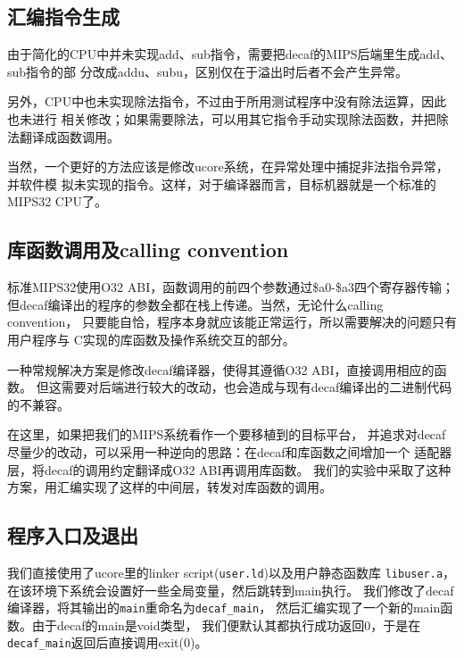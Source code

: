 
\subsection{汇编指令生成}
由于简化的CPU中并未实现add、sub指令，需要把decaf的MIPS后端里生成add、sub指令的部
分改成addu、subu，区别仅在于溢出时后者不会产生异常。

另外，CPU中也未实现除法指令，不过由于所用测试程序中没有除法运算，因此也未进行
相关修改；如果需要除法，可以用其它指令手动实现除法函数，并把除法翻译成函数调用。

当然，一个更好的方法应该是修改ucore系统，在异常处理中捕捉非法指令异常，并软件模
拟未实现的指令。这样，对于编译器而言，目标机器就是一个标准的MIPS32 CPU了。

\subsection{库函数调用及calling convention}
标准MIPS32使用O32 ABI，函数调用的前四个参数通过\$a0-\$a3四个寄存器传输；
但decaf编译出的程序的参数全都在栈上传递。当然，无论什么calling convention，
只要能自恰，程序本身就应该能正常运行，所以需要解决的问题只有用户程序与
C实现的库函数及操作系统交互的部分。

一种常规解决方案是修改decaf编译器，使得其遵循O32 ABI，直接调用相应的函数。
但这需要对后端进行较大的改动，也会造成与现有decaf编译出的二进制代码的不兼容。

在这里，如果把我们的MIPS系统看作一个要移植到的目标平台，
并追求对decaf尽量少的改动，可以采用一种逆向的思路：在decaf和库函数之间增加一个
适配器层，将decaf的调用约定翻译成O32 ABI再调用库函数。
我们的实验中采取了这种方案，用汇编实现了这样的中间层，转发对库函数的调用。

\subsection{程序入口及退出}
我们直接使用了ucore里的linker script(\verb|user.ld|)以及用户静态函数库
\verb|libuser.a|，在该环境下系统会设置好一些全局变量，然后跳转到main执行。
我们修改了decaf编译器，将其输出的\verb|main|重命名为\verb|decaf_main|，
然后汇编实现了一个新的main函数。由于decaf的main是void类型，
我们便默认其都执行成功返回0，于是在\verb|decaf_main|返回后直接调用exit(0)。

